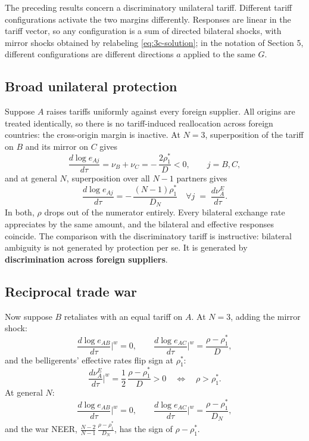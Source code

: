 \documentclass[11pt]{article}
\begin{document}
The preceding results concern a discriminatory unilateral tariff. Different tariff configurations activate the two margins differently. Responses are linear in the tariff vector, so any configuration is a sum of directed bilateral shocks, with mirror shocks obtained by relabeling \eqref{eq:3c-solution}; in the notation of Section 5, different configurations are different directions $a$ applied to the same $G$.

\subsection{Broad unilateral protection}

Suppose $A$ raises tariffs uniformly against every foreign supplier. All origins are treated identically, so there is no tariff-induced reallocation across foreign countries: the cross-origin margin is inactive. At $N = 3$, superposition of the tariff on $B$ and its mirror on $C$ gives
\begin{equation}
\frac{d\log e_{Aj}}{d\tau} = \nu_B + \nu_C = -\,\frac{2\rho_1^*}{D} < 0, \qquad j = B, C,
\label{eq:3c-broad}
\end{equation}
and at general $N$, superposition over all $N-1$ partners gives
\begin{equation}
\frac{d\log e_{Aj}}{d\tau} = -\,\frac{(N-1)\rho_1^*}{D_N} \quad \forall j
\;=\; \frac{d\nu_A^E}{d\tau} .
\label{eq:N-broad}
\end{equation}
In both, $\rho$ drops out of the numerator entirely. Every bilateral exchange rate appreciates by the same amount, and the bilateral and effective responses coincide. The comparison with the discriminatory tariff is instructive: bilateral ambiguity is not generated by protection per se. It is generated by \textbf{discrimination across foreign suppliers}.

\subsection{Reciprocal trade war}

Now suppose $B$ retaliates with an equal tariff on $A$. At $N = 3$, adding the mirror shock:
\begin{equation}
\frac{d\log e_{AB}}{d\tau}\bigg|^{w} = 0,
\qquad
\frac{d\log e_{AC}}{d\tau}\bigg|^{w} = \frac{\rho - \rho_1^*}{D},
\label{eq:3c-war}
\end{equation}
and the belligerents' effective rates flip sign at $\rho_1^*$:
\begin{equation}
\frac{d\nu_A^{E}}{d\tau}\bigg|^{w} = \frac{1}{2}\,\frac{\rho - \rho_1^*}{D} > 0
\quad\Longleftrightarrow\quad
\rho > \rho_1^* .
\label{eq:3c-warneer}
\end{equation}
At general $N$:
\begin{equation}
\frac{d\log e_{AB}}{d\tau}\bigg|^{w} = 0,
\qquad
\frac{d\log e_{AC}}{d\tau}\bigg|^{w} = \frac{\rho - \rho_1^*}{D_N},
\label{eq:N-war}
\end{equation}
and the war NEER, $\tfrac{N-2}{N-1}\,\tfrac{\rho-\rho_1^*}{D_N}$, has the sign of $\rho - \rho_1^*$.
\end{document}
